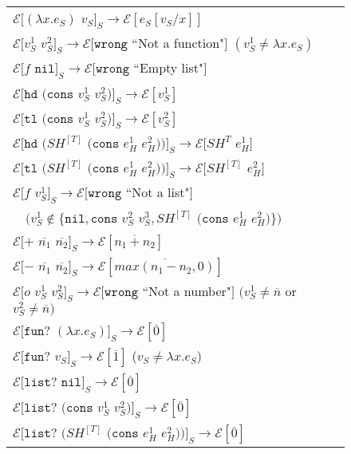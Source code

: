 \begin{figure}[p]
\centering
\begin{tabular}{l}
$\mathscr{E}[(\lambda x.e_{S})$ $v_{S}]_{S}\rightarrow\mathscr{E}[e_{S}[v_{S}/x]]$ \\
$\mathscr{E}[v_{S}^{1}$ $v_{S}^{2}]_{S}\rightarrow\mathscr{E}[\mathtt{wrong}$ ``Not a function"$]$ $(v_{S}^{1}\neq\lambda x.e_{S})$ \\
$\mathscr{E}[f$ $\mathtt{nil}]_{S}\rightarrow\mathscr{E}[\mathtt{wrong}$ ``Empty list"$]$ \\
$\mathscr{E}[\mathtt{hd}$ $(\mathtt{cons}$ $v_{S}^{1}$ $v_{S}^{2})]_{S}\rightarrow\mathscr{E}[v_{S}^{1}]$ \\
$\mathscr{E}[\mathtt{tl}$ $(\mathtt{cons}$ $v_{S}^{1}$ $v_{S}^{2})]_{S}\rightarrow\mathscr{E}[v_{S}^{2}]$ \\
$\mathscr{E}[\mathtt{hd}$ $(SH^{[T]}$ $(\mathtt{cons}$ $e_{H}^{1}$ $e_{H}^{2}))]_{S}\rightarrow\mathscr{E}[SH^{T}$ $e_{H}^{1}]$ \\
$\mathscr{E}[\mathtt{tl}$ $(SH^{[T]}$ $(\mathtt{cons}$ $e_{H}^{1}$ $e_{H}^{2}))]_{S}\rightarrow\mathscr{E}[SH^{[T]}$ $e_{H}^{2}]$ \\
$\mathscr{E}[f$ $v_{S}^{1}]_{S}\rightarrow\mathscr{E}[\mathtt{wrong}$ ``Not a list"$]$ \\
$\quad(v_{S}^{1}\not\in\lbrace\mathtt{nil},\mathtt{cons}$ $v_{S}^{2}$ $v_{S}^{3},SH^{[T]}$ $(\mathtt{cons}$ $e_{H}^{1}$ $e_{H}^{2})\rbrace)$ \\
$\mathscr{E}[+$ $\overline{n_{1}}$ $\overline{n_{2}}]_{S}\rightarrow\mathscr{E}[\overline{n_{1}+n_{2}}]$ \\
$\mathscr{E}[-$ $\overline{n_{1}}$ $\overline{n_{2}}]_{S}\rightarrow\mathscr{E}[\overline{max(n_{1}-n_{2},0)}]$ \\
$\mathscr{E}[o$ $v_{S}^{1}$ $v_{S}^{2}]_{S}\rightarrow\mathscr{E}[\mathtt{wrong}$ ``Not a number"$]$ $(v_{S}^{1}\neq\overline{n}$ or $v_{S}^{2}\neq\overline{n})$ \\
$\mathscr{E}[\mathtt{fun?}$ $(\lambda x.e_{S})]_{S}\rightarrow\mathscr{E}[\overline{0}]$ \\
$\mathscr{E}[\mathtt{fun?}$ $v_{S}]_{S}\rightarrow\mathscr{E}[\overline{1}]$ ($v_{S}\neq\lambda x.e_{S}$) \\
$\mathscr{E}[\mathtt{list?}$ $\mathtt{nil}]_{S}\rightarrow\mathscr{E}[\overline{0}]$ \\
$\mathscr{E}[\mathtt{list?}$ $(\mathtt{cons}$ $v_{S}^{1}$ $v_{S}^{2})]_{S}\rightarrow\mathscr{E}[\overline{0}]$ \\
$\mathscr{E}[\mathtt{list?}$ $(SH^{[T]}$ $(\mathtt{cons}$ $e_{H}^{1}$ $e_{H}^{2}))]_{S}\rightarrow\mathscr{E}[\overline{0}]$ \\

\end{tabular}
\end{figure}
